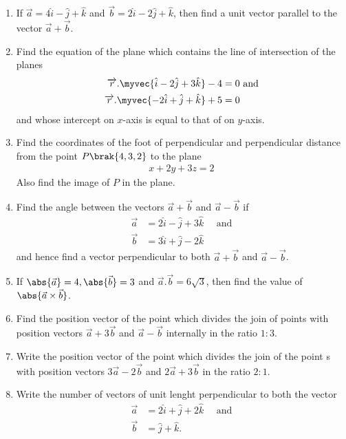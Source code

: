 \begin{enumerate}
	\item If $\overrightarrow{a} = 4\hat{i} - \hat{j} +\hat{k}$ and $\overrightarrow{b} = 2\hat{i} - 2\hat{j} + \hat{k}$, then find a unit vector parallel to the vector $\overrightarrow{a}+\overrightarrow{b}$.

	\item Find the equation of the plane which contains the line of intersection of the planes
	      \begin{align*}
		      \overrightarrow{r}.\myvec{\hat{i} - 2\hat{j} + 3\hat{k}} - 4 & = 0 \text{  and} \\
		      \overrightarrow{r}.\myvec{-2\hat{i} + \hat{j} + \hat{k}} + 5 & = 0
	      \end{align*}
	      and whose intercept on $x$-axis is equal to that of on $y$-axis.
	\item Find the coordinates of the foot of perpendicular and perpendicular distance from the point $P\brak{4, 3, 2}$ to the plane
	      \begin{align*}
		      x+2y+3z=2
	      \end{align*}
	      Also find the image of $P$ in the plane.
	\item Find the angle between the vectors $\vec{a} + \vec{b}$ and $\vec{a}-\vec{b}$ if
	      \begin{align*}
		      \vec{a} & =2\hat{i}-\hat{j}+3\hat{k} \quad \text{ and} \\
		      \vec{b} & = 3\hat{i} + \hat{j} -2\hat{k}
	      \end{align*}
	      and hence find a vector perpendicular to both $\vec{a}+\vec{b}$ and $\vec{a}-\vec{b}$.
	\item If  $\abs{\vec{a}} = 4 , \abs{\vec{b}}=3$  and $\vec{a}.\vec{b}=6\sqrt{3}$, then find the value of $\abs{\vec{a}\times \vec{b}}$.
	\item Find the position vector of the point which divides the join of points with position vectors $\vec{a}+3\vec{b}$ and $\vec{a}-\vec{b}$ internally in the ratio $1:3$.
	\item Write the position vector of the point which divides the join of the point s with position vectors $3\vec{a} - 2\vec{b}$ and $2\vec{a} + 3\vec{b}$ in the ratio $2:1$.
	\item Write the number of vectors of unit lenght perpendicular to both the vector
	      \begin{align*}
		      \vec{a} & = 2 \hat{i} + \hat{j} +2\hat{k} \quad\text{ and} \\
		      \vec{b} & = \hat{j}+\hat{k}.

\end{align*}
\end{enumerate}
